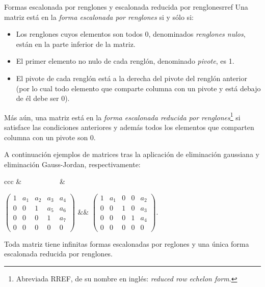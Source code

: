 \documentclass{fmbnotes}
\begin{document}
\begin{definicion}{Formas escalonada por renglones y escalonada reducida por renglones}{rref}
Una matriz está en la \emph{forma escalonada por renglones} si y sólo si: 
\begin{itemize}
\item Los renglones cuyos elementos son todos 0, denominados \emph{renglones nulos}, están en la parte inferior de la matriz.
\item El primer elemento no nulo de cada renglón, denominado \emph{pivote}, es 1. 
\item El pivote de cada renglón está a la derecha del pivote del renglón anterior (por lo cual todo elemento que comparte columna con un pivote y está debajo de él debe ser 0).
\end{itemize}
Más aún, una matriz está en la \emph{forma escalonada reducida por renglones}\footnote{Abreviada RREF, de su nombre en inglés: \textit{reduced row echelon form}.} si satisface las condiciones anteriores y además todos los elementos que comparten columna con un pivote son 0.
\end{definicion}

A continuación ejemplos de matrices tras la aplicación de eliminación gaussiana y eliminación Gauss-Jordan, respectivamente:
\begin{center}
\begin{tabular}{ccc}
	 & \(\qquad \quad \qquad\)&  \\
	\rule[4.7ex]{0pt}{2.5ex}\(\begin{pmatrix}
		1 & a_1 & a_2 & a_3 & a_4 \\
		0 & 0 & 1 & a_5 & a_6 \\
		0 & 0 & 0 & 1 & a_7 \\
		0 & 0 & 0 & 0 & 0
	\end{pmatrix}\) && \(\begin{pmatrix}
		1 & a_1 & 0 & 0 & a_2 \\
		0 & 0 & 1 & 0 & a_3 \\
		0 & 0 & 0 & 1 & a_4 \\
		0 & 0 & 0 & 0 & 0
	\end{pmatrix}\).
\end{tabular}
\end{center}

Toda matriz tiene infinitas formas escalonadas por reglones y una única forma escalonada reducida por renglones.
\end{document}
